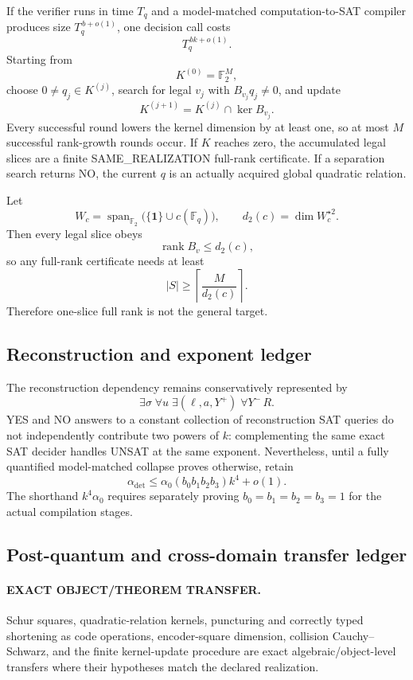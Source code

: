 \documentclass[11pt]{article}
\begin{document}
If the verifier runs in time \(T_q\) and a model-matched computation-to-SAT
compiler produces size \(T_q^{\,b+o(1)}\), one decision call costs
\[
 \boxed{T_q^{\,bk+o(1)}}.
\]
Starting from
\[
 K^{(0)}=\mathbb F_2^M,
\]
choose \(0\ne q_j\in K^{(j)}\), search for legal \(v_j\) with
\(B_{v_j}q_j\ne0\), and update
\[
 K^{(j+1)}=K^{(j)}\cap\ker B_{v_j}.
\]
Every successful round lowers the kernel dimension by at least one, so at
most \(M\) successful rank-growth rounds occur.  If \(K\) reaches zero, the
accumulated legal slices are a finite SAME\_REALIZATION full-rank
certificate.  If a separation search returns NO, the current \(q\) is an
actually acquired global quadratic relation.

Let
\[
 W_c=\operatorname{span}_{\mathbb F_2}
 \bigl(\{\mathbf1\}\cup c(\mathbb F_q)\bigr),
 \qquad
 d_2(c)=\dim W_c^{\star2}.
\]
Then every legal slice obeys
\[
 \operatorname{rank}B_v\le d_2(c),
\]
so any full-rank certificate needs at least
\[
 \boxed{|S|\ge\left\lceil\frac{M}{d_2(c)}\right\rceil}.
\]
Therefore one-slice full rank is not the general target.

\subsection{Reconstruction and exponent ledger}

The reconstruction dependency remains conservatively represented by
\[
 \boxed{\exists\sigma\;\forall u\;
 \exists(\ell,a,Y^+)\;\forall Y^-\,R}.
\]
YES and NO answers to a constant collection of reconstruction SAT queries
do not independently contribute two powers of \(k\): complementing the same
exact SAT decider handles UNSAT at the same exponent.  Nevertheless, until
a fully quantified model-matched collapse proves otherwise, retain
\[
 \boxed{\alpha_{\mathrm{det}}
 \le
 \alpha_0(b_0b_1b_2b_3)k^4+o(1)}.
\]
The shorthand \(k^4\alpha_0\) requires separately proving
\(b_0=b_1=b_2=b_3=1\) for the actual compilation stages.

\subsection{Post-quantum and cross-domain transfer ledger}

\paragraph{EXACT OBJECT/THEOREM TRANSFER.}
Schur squares, quadratic-relation kernels, puncturing and correctly typed
shortening as code operations, encoder-square dimension, collision
Cauchy--Schwarz, and the finite kernel-update procedure are exact
algebraic/object-level transfers where their hypotheses match the declared
realization.
\end{document}
